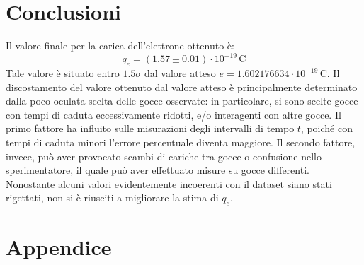 \documentclass[]{article}
\let\oldsection\section%
\renewcommand{\section}{%
	\renewcommand{\theequation}{\thesection.\arabic{equation}}%
	\oldsection}%
\begin{document}
    \section{Conclusioni}
    Il valore finale per la carica dell'elettrone ottenuto è:
    \begin{equation}
        q_e = \left( 1.57 \pm 0.01 \right) \cdot 10^{-19} \, \text{C}
    \end{equation}
    Tale valore è situato entro $1.5\sigma$ dal valore atteso $e = 1.602176634 \cdot 10^{-19} \, \text{C}$. Il discostamento del valore ottenuto dal valore atteso è principalmente determinato dalla poco oculata scelta delle gocce osservate: in particolare, si sono scelte gocce con tempi di caduta eccessivamente ridotti, e/o interagenti con altre gocce. Il primo fattore ha influito sulle misurazioni degli intervalli di tempo $t$, poiché con tempi di caduta minori l'errore percentuale diventa maggiore. Il secondo fattore, invece, può aver provocato scambi di cariche tra gocce o confusione nello sperimentatore, il quale può aver effettuato misure su gocce differenti. \\
    Nonostante alcuni valori evidentemente incoerenti con il dataset siano stati rigettati, non si è riusciti a migliorare la stima di $q_e$.
    
    \newpage

    \section*{Appendice}
\end{document}
